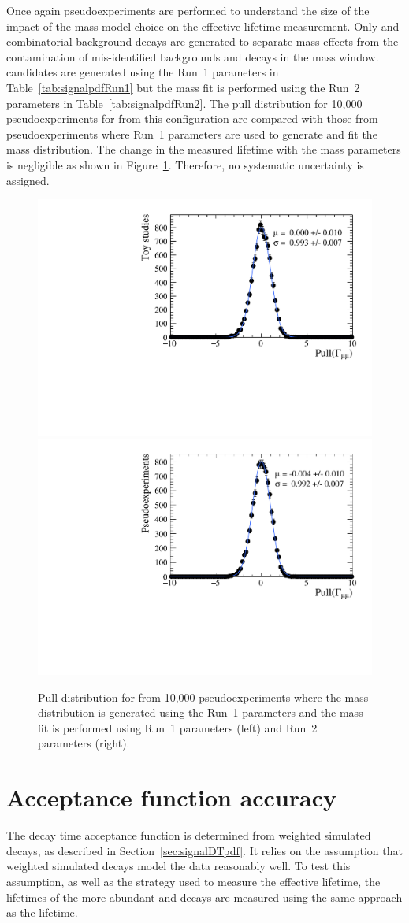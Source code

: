 Once again pseudoexperiments are performed to understand the size of the impact of the mass model choice on the effective lifetime measurement. Only \bsmumu and combinatorial background decays are generated to separate mass \pdf effects from the contamination of mis-identified backgrounds and \bdmumu decays in the mass window. \bsmumu candidates are generated using the Run~1 parameters in Table~\ref{tab:signalpdfRun1} but the mass fit is performed using the Run~2 parameters in Table~\ref{tab:signalpdfRun2}. The pull distribution for 10,000 pseudoexperiments for \Gmumu from this configuration are compared with those from pseudoexperiments where Run~1 parameters are used to generate and fit the mass distribution. The change in the measured lifetime with the mass \pdf parameters is negligible as shown in Figure~\ref{fig:masspdfsyst}. Therefore, no systematic uncertainty is assigned. 

\begin{figure}[htbp]
    \centering
        \includegraphics[width=0.49 \textwidth]{./Figs/LifetimeSystematics/Gamma_pull_mass_pdf_Run1.pdf}
        \includegraphics[width=0.49 \textwidth]{./Figs/LifetimeSystematics/Gamma_pull_mass_pdf_Run2.pdf}
    \caption{Pull distribution for \Gmumu from 10,000 pseudoexperiments where the \bsmumu mass distribution is generated using the Run~1 parameters and the mass fit is performed using Run~1 parameters (left) and Run~2 parameters (right).}
    \label{fig:masspdfsyst}
\end{figure}


\section{Acceptance function accuracy}
\label{sec:accptsyst}
The decay time acceptance function is determined from weighted simulated decays, as described in Section~\ref{sec:signalDTpdf}. It relies on the assumption that weighted simulated decays model the data reasonably well. To test this assumption, as well as the strategy used to measure the \bsmumu effective lifetime, the lifetimes of the more abundant \bdkpi and \bskk decays are measured using the same approach as the \bsmumu lifetime.

